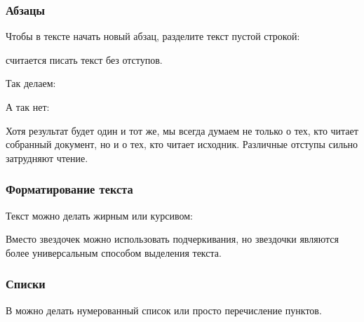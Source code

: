 \documentclass[letterpaper,10pt,russian]{sphinxmanual}
\begin{document}
\begin{sphinxVerbatim}[commandchars=\\\{\}]
  


 

\end{sphinxVerbatim}


\subsubsection{Абзацы}
\label{\detokenize{educational_materials/docs/content:id4}}
\sphinxAtStartPar
Чтобы в тексте начать новый абзац, разделите текст пустой строкой:

\sphinxAtStartPar
{}

\sphinxAtStartPar
{} считается писать текст без отступов.

\sphinxAtStartPar
Так делаем:

\sphinxAtStartPar
{}

\sphinxAtStartPar
А так нет:

\sphinxAtStartPar
{}

\sphinxAtStartPar
Хотя результат будет один и тот же, мы всегда думаем не только о тех, кто читает собранный документ, но и о тех, кто читает исходник. Различные отступы сильно затрудняют чтение.


\subsubsection{Форматирование текста}
\label{\detokenize{educational_materials/docs/content:id5}}
\sphinxAtStartPar
Текст можно делать жирным или курсивом:

\sphinxAtStartPar
{}

\sphinxAtStartPar
Вместо звездочек можно использовать подчеркивания, но звездочки являются более универсальным способом выделения текста.

\sphinxAtStartPar
{}


\subsubsection{Списки}
\label{\detokenize{educational_materials/docs/content:id6}}
\sphinxAtStartPar
В  можно делать нумерованный список или просто перечисление пунктов.
\end{document}

